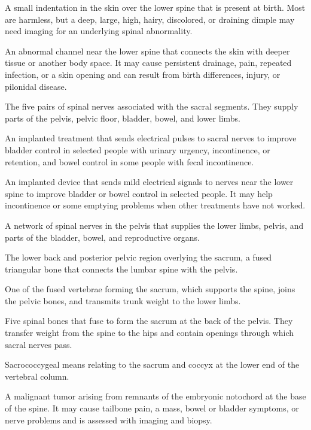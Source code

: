 A small indentation in the skin over the lower spine that is present at birth. Most are harmless, but a deep, large, high, hairy, discolored, or draining dimple may need imaging for an underlying spinal abnormality.

 An abnormal channel near the lower spine that connects the skin with deeper tissue or another body space. It may cause persistent drainage, pain, repeated infection, or a skin opening and can result from birth differences, injury, or pilonidal disease.

 The five pairs of spinal nerves associated with the sacral segments. They supply parts of the pelvis, pelvic floor, bladder, bowel, and lower limbs.

 An implanted treatment that sends electrical pulses to sacral nerves to improve bladder control in selected people with urinary urgency, incontinence, or retention, and bowel control in some people with fecal incontinence.

 An implanted device that sends mild electrical signals to nerves near the lower spine to improve bladder or bowel control in selected people. It may help incontinence or some emptying problems when other treatments have not worked.

 A network of spinal nerves in the pelvis that supplies the lower limbs, pelvis, and parts of the bladder, bowel, and reproductive organs.

 The lower back and posterior pelvic region overlying the sacrum, a fused triangular bone that connects the lumbar spine with the pelvis.

 One of the fused vertebrae forming the sacrum, which supports the spine, joins the pelvic bones, and transmits trunk weight to the lower limbs.

 Five spinal bones that fuse to form the sacrum at the back of the pelvis. They transfer weight from the spine to the hips and contain openings through which sacral nerves pass.

 Sacrococcygeal means relating to the sacrum and coccyx at the lower end of the vertebral column.

 A malignant tumor arising from remnants of the embryonic notochord at the base of the spine. It may cause tailbone pain, a mass, bowel or bladder symptoms, or nerve problems and is assessed with imaging and biopsy.

